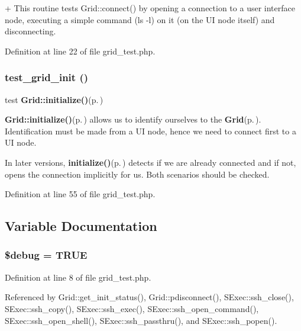 + This routine tests Grid::connect() by opening a connection to a user interface node, executing a simple command (ls -l) on it (on the UI node itself) and disconnecting. 

Definition at line 22 of file grid\_\-test.php.
\subsubsection{\setlength{\rightskip}{0pt plus 5cm}test\_\-grid\_\-init ()}\label{grid__test_8php_a2}


test {\bf Grid::initialize()}{\rm (p.\,\pageref{grid_8php_a0})} 

{\bf Grid::initialize()}{\rm (p.\,\pageref{grid_8php_a0})} allows us to identify ourselves to the {\bf Grid}{\rm (p.\,\pageref{classGrid})}. Identification must be made from a UI node, hence we need to connect first to a UI node.

In later versions, {\bf initialize()}{\rm (p.\,\pageref{grid_8php_a0})} detects if we are already connected and if not, opens the connection implicitly for us. Both scenarios should be checked. 

Definition at line 55 of file grid\_\-test.php.

\subsection{Variable Documentation}
\subsubsection{\setlength{\rightskip}{0pt plus 5cm}\$debug = TRUE}\label{grid__test_8php_a0}




Definition at line 8 of file grid\_\-test.php.

Referenced by Grid::get\_\-init\_\-status(), Grid::pdisconnect(), SExec::ssh\_\-close(), SExec::ssh\_\-copy(), SExec::ssh\_\-exec(), SExec::ssh\_\-open\_\-command(), SExec::ssh\_\-open\_\-shell(), SExec::ssh\_\-passthru(), and SExec::ssh\_\-popen().